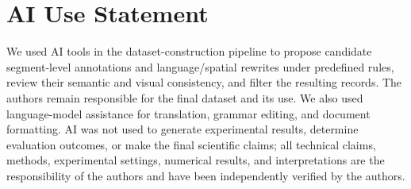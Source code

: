 \section*{AI Use Statement}
We used AI tools in the dataset-construction pipeline to propose candidate
segment-level annotations and language/spatial rewrites under predefined
rules, review their semantic and visual consistency, and filter the
resulting records. The authors remain responsible for the final dataset and its use.
We also used language-model
assistance for translation, grammar
editing, and document formatting. AI was not used to generate experimental
results, determine evaluation outcomes, or make the final scientific claims;
all technical claims, methods,
experimental settings, numerical results, and interpretations are the
responsibility of the authors and have been independently verified by the authors.

